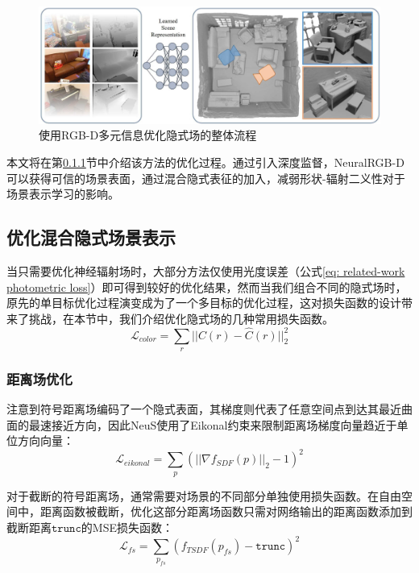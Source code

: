 \begin{figure}[htbp]
    \centering
    \includegraphics[width=\textwidth]{undergraduate-thesis/images/related-work/neural-rgbd problem.png}
    \caption{使用RGB-D多元信息优化隐式场的整体流程}
    \label{fig:related-work neural-rgbd formulation}
\end{figure}

本文将在第\ref{sec: related-work SDF optimization}节中介绍该方法的优化过程。通过引入深度监督，NeuralRGB-D可以获得可信的场景表面，通过混合隐式表征的加入，减弱形状-辐射二义性对于场景表示学习的影响。

\subsection{优化混合隐式场景表示}
当只需要优化神经辐射场时，大部分方法仅使用光度误差（公式\ref{eq: related-work photometric loss}）即可得到较好的优化结果，然而当我们组合不同的隐式场时，原先的单目标优化过程演变成为了一个多目标的优化过程，这对损失函数的设计带来了挑战，在本节中，我们介绍优化隐式场的几种常用损失函数。
\begin{equation}
    \mathcal{L}_{color} = \sum_r||C(r)-\hat{C}(r)||_2^2
    \label{eq: related-work photometric loss}
\end{equation}

\subsubsection{距离场优化}
\label{sec: related-work SDF optimization}
注意到符号距离场编码了一个隐式表面，其梯度则代表了任意空间点到达其最近曲面的最速接近方向，因此NeuS\cite{wang_neus_2021}使用了Eikonal约束来限制距离场梯度向量趋近于单位方向向量：
\begin{equation}
    \mathcal{L}_{eikonal} = \sum_p(||\nabla f_{SDF}(p)||_2-1)^2
\end{equation}

对于截断的符号距离场\cite{azinovic_neural_2022}，通常需要对场景的不同部分单独使用损失函数。在自由空间中，距离函数被截断，优化这部分距离场函数只需对网络输出的距离函数添加到截断距离$\mathtt{trunc}$的MSE损失函数：
\begin{equation}
    \mathcal{L}_{fs} = \sum_{p_{fs}}(f_{TSDF}(p_{fs})-\mathtt{trunc})^2
\end{equation}

